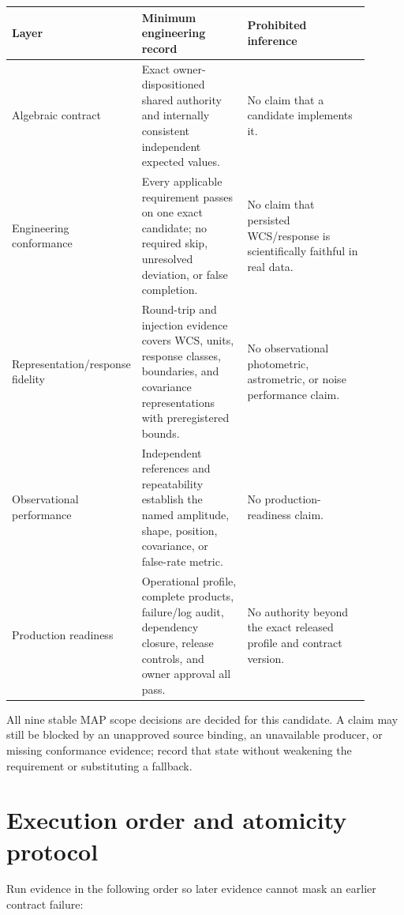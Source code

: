 \documentclass[10pt]{article}
\begin{document}
\begin{longtable}{L{0.22\linewidth}L{0.31\linewidth}L{0.37\linewidth}}
\toprule
Layer & Minimum engineering record & Prohibited inference\\
\midrule
Algebraic contract & Exact owner-dispositioned shared authority and internally consistent
independent expected values. & No claim that a candidate implements it.\\
Engineering conformance & Every applicable requirement passes on one exact
candidate; no required skip, unresolved deviation, or false completion. & No
claim that persisted WCS/response is scientifically faithful in real data.\\
Representation/response fidelity & Round-trip and injection evidence covers
WCS, units, response classes, boundaries, and covariance representations with
preregistered bounds. & No observational photometric, astrometric, or noise
performance claim.\\
Observational performance & Independent references and repeatability establish
the named amplitude, shape, position, covariance, or false-rate metric. & No
production-readiness claim.\\
Production readiness & Operational profile, complete products, failure/log
audit, dependency closure, release controls, and owner approval all pass. & No
authority beyond the exact released profile and contract version.\\
\bottomrule
\end{longtable}

All nine stable MAP scope decisions are decided for this candidate.  A claim
may still be blocked by an unapproved source binding, an unavailable producer,
or missing conformance evidence; record that state without weakening the
requirement or substituting a fallback.

\section{Execution order and atomicity protocol}

Run evidence in the following order so later evidence cannot mask an earlier
contract failure:
\end{document}
